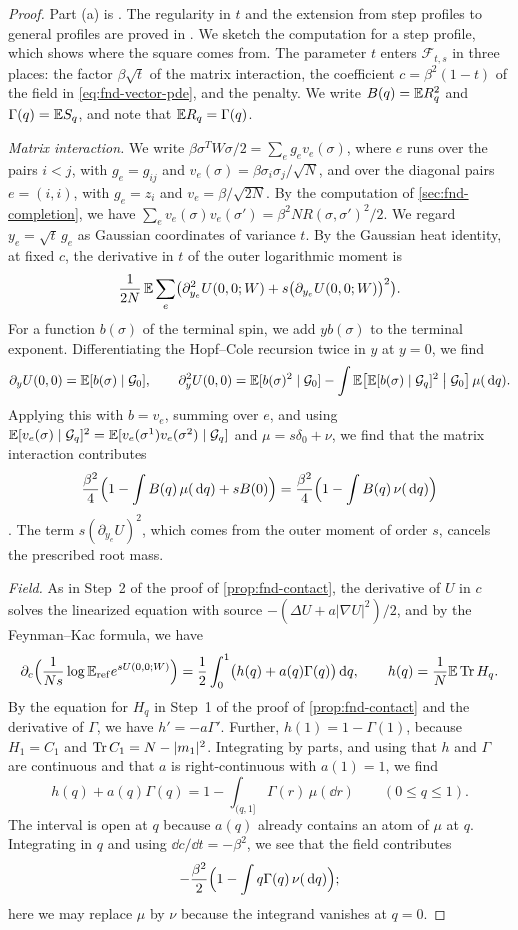 \begin{proof}
Part (a) is \cite[Proposition~2.3 and (2.12)]{AL}. The regularity in $t$
and the extension from step profiles to general profiles are proved in
\cite[Section~2.6.3]{AL}. We sketch the computation for a step profile,
which shows where the square comes from. The parameter $t$ enters
$\mathcal F_{t,s}$ in three places: the factor $\beta\sqrt t$ of the
matrix interaction, the coefficient $c=\beta^2(1-t)$ of the field in
\eqref{eq:fnd-vector-pde}, and the penalty. We write $B(q)=\mathbb E R_q^2$
and $\Gamma(q)=\mathbb E S_q$, and note that $\mathbb E R_q=\Gamma(q)$.

\emph{Matrix interaction.} We write
$\beta\sigma^TW\sigma/2=\sum_eg_ev_e(\sigma)$, where $e$ runs over the
pairs $i<j$, with $g_e=g_{ij}$ and $v_e(\sigma)=\beta\sigma_i\sigma_j/\sqrt N$,
and over the diagonal pairs $e=(i,i)$, with $g_e=z_i$ and
$v_e=\beta/\sqrt{2N}$. By the computation of
\cref{sec:fnd-completion}, we have
$\sum_ev_e(\sigma)v_e(\sigma')=\beta^2NR(\sigma,\sigma')^2/2$. We regard
$y_e=\sqrt t\,g_e$ as Gaussian coordinates of variance $t$. By the
Gaussian heat identity, at fixed $c$, the derivative in $t$ of the outer
logarithmic moment is
\[
 \frac1{2N}\,\mathbb E\sum_e\bigl(\partial_{y_e}^2U(0,0;W)
   +s\bigl(\partial_{y_e}U(0,0;W)\bigr)^2\bigr).
\]
For a function $b(\sigma)$ of the terminal spin, we add $yb(\sigma)$ to
the terminal exponent. Differentiating the Hopf--Cole recursion twice in
$y$ at $y=0$, we find \cite[(2.10)]{AL}
\[
 \partial_yU(0,0)=\mathbb E[b(\sigma)\mid\mathcal G_0],\qquad
 \partial_y^2U(0,0)=\mathbb E[b(\sigma)^2\mid\mathcal G_0]
 -\int\mathbb E\bigl[\mathbb E[b(\sigma)\mid\mathcal G_q]^2\bigm|\mathcal G_0\bigr]\,\mu(\,\mathrm d q).
\]
Applying this with $b=v_e$, summing over $e$, and using
$\mathbb E[v_e(\sigma)\mid\mathcal G_q]^2=\mathbb E[v_e(\sigma^1)v_e(\sigma^2)\mid\mathcal G_q]$
and $\mu=s\delta_0+\nu$, we find that the matrix interaction contributes
\[
 \frac{\beta^2}4\Bigl(1-\int B(q)\,\mu(\,\mathrm d q)+sB(0)\Bigr)
 =\frac{\beta^2}4\Bigl(1-\int B(q)\,\nu(\,\mathrm d q)\Bigr)
\]
\cite[(2.11)]{AL}. The term $s(\partial_{y_e}U)^2$, which comes from
the outer moment of order $s$, cancels the prescribed root mass.

\emph{Field.} As in Step~2 of the proof of \cref{prop:fnd-contact}, the
derivative of $U$ in $c$ solves the linearized equation with source
$-(\Delta U+a|\nabla U|^2)/2$, and by the Feynman--Kac formula, we have
\[
 \partial_c\Bigl(\frac1{Ns}\log\mathbb E_{\rm ref}e^{sU(0,0;W)}\Bigr)
 =\frac12\int_0^1\bigl(h(q)+a(q)\Gamma(q)\bigr)\,\mathrm d q,
 \qquad h(q)=\frac1N\mathbb E\operatorname{Tr} H_q .
\]
By the equation for $H_q$ in Step~1 of the proof of
\cref{prop:fnd-contact} and the derivative of $\Gamma$, we have
$h'=-a\Gamma'$. Further, $h(1)=1-\Gamma(1)$, because $H_1=C_1$ and
$\operatorname{Tr} C_1=N-|m_1|^2$. Integrating by parts, and using that $h$ and $\Gamma$ are continuous
and that $a$ is right-continuous with $a(1)=1$, we find
\[
 h(q)+a(q)\Gamma(q)=1-\int_{(q,1]}\Gamma(r)\,\mu(\dd r)
 \qquad(0\le q\le1).
\]
The interval is open at $q$ because $a(q)$ already contains an atom of
$\mu$ at $q$. Integrating in $q$ and using $\dd c/\dd t=-\beta^2$, we
see that the field contributes
\[
 -\frac{\beta^2}2\Bigl(1-\int q\Gamma(q)\,\nu(\,\mathrm d q)\Bigr);
\]
here we may replace $\mu$ by $\nu$ because the integrand vanishes at
$q=0$.


\end{proof}
